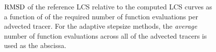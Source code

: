 \begin{figure}[htpb]
    \centering
        
    \caption[$\rmsd$ of the reference LCS relative to the computed LCS
    curves relative a function of the required number of function evaluations
    per advected tracer]
    {$\rmsd$ of the reference LCS relative to the computed LCS curves as a
        function of of the required number of function evaluations per advected tracer.
        For the adaptive stepsize methods, the \emph{average} number of function
    evaluations across all of the advected tracers is used as the abscissa.}
    \label{fig:lcs_rmsd_fn_nn_both}
\end{figure}
